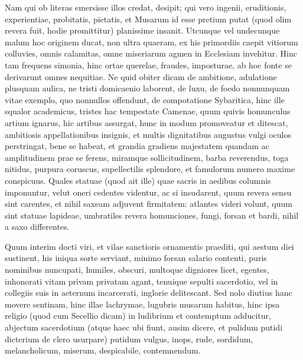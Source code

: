 {{Nam qui ob
literas emersisse illos credat, desipit; qui vero ingenii, eruditionis,
experientiae, probitatis, pietatis, et Musarum id esse pretium putat
(quod olim revera fuit, hodie promittitur) planissime insanit. Utcunque
vel undecunque malum hoc originem ducat, non ultra quaeram, ex his
primordiis caepit vitiorum colluvies, omnis calamitas, omne miseriarum
agmen in Ecclesiam invehitur. Hinc tam frequens simonia, hinc ortae
querelae, fraudes, imposturae, ab hoc fonte se derivarunt omnes
nequitiae. Ne quid obiter dicam de ambitione, adulatione plusquam
aulica, ne tristi domicaenio laborent, de luxu, de foedo nonnunquam
vitae exemplo, quo nonnullos offendunt, de compotatione Sybaritica, \etc{}
hinc ille squalor academicus, tristes hac tempestate Camenae, quum
quivis homunculus artium ignarus, hic artibus assurgat, hunc in modum
promoveatur et ditescat, ambitiosis appellationibus insignis, et multis
dignitatibus augustus vulgi oculos perstringat, bene se habeat, et
grandia gradiens majestatem quandam ac amplitudinem prae se ferens,
miramque sollicitudinem, barba reverendus, toga nitidus, purpura
coruscus, supellectilis splendore, et famulorum numero maxime
conspicuus. Quales statuae (quod ait ille) quae sacris in aedibus
columnis imponuntur, velut oneri cedentes videntur, ac si insudarent,
quum revera sensu sint carentes, et nihil saxeam adjuvent firmitatem:
atlantes videri volunt, quum sint statuae lapideae, umbratiles revera
homunciones, fungi, forsan et bardi, nihil a saxo differentes.

Quum interim docti viri, et vilae sanctioris ornamentis praediti, qui aestum
diei sustinent, his iniqua sorte serviant, minimo forsan salario
contenti, puris nominibus nuncupati, humiles, obscuri, multoque
digniores licet, egentes, inhonorati vitam privam privatam agant,
tenuique sepulti sacerdotio, vel in collegiis suis in aeternum
incarcerati, inglorie delitescant. Sed nolo diutius hanc movere
sentinam, hinc illae lachrymae, lugubris musarum habitus, hinc
ipsa religio (quod cum Secellio dicam) in ludibrium et contemptum
adducitur, abjectum sacerdotium (atque haec ubi fiunt, ausim dicere, et
pulidum  putidi dicterium de clero usurpare) putidum vulgus,
inops, rude, sordidum, melancholicum, miserum, despicabile,
contemnendum.}

}
